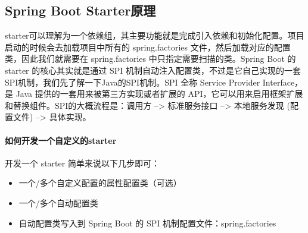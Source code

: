 \documentclass[../../../interview-questions.tex]{subfiles}
\begin{document}
\subsection{Spring Boot Starter原理}

starter可以理解为一个依赖组，其主要功能就是完成引入依赖和初始化配置。项目启动的时候会去加载项目中所有的 spring.factories 文件，然后加载对应的配置类，因此我们就需要在 spring.factories 中只指定需要扫描的类。Spring Boot 的 starter 的核心其实就是通过 SPI 机制自动注入配置类，不过是它自己实现的一套SPI机制，我们先了解一下Java的SPI机制。SPI 全称 Service Provider Interface，是 Java 提供的一套用来被第三方实现或者扩展的 API，它可以用来启用框架扩展和替换组件。SPI的大概流程是：调用方 –> 标准服务接口 –> 本地服务发现 (配置文件) –> 具体实现。

\paragraph{如何开发一个自定义的starter}

开发一个 starter 简单来说以下几步即可：

\begin{itemize}
    \item {一个/多个自定义配置的属性配置类（可选）}
    \item {一个/多个自动配置类}
    \item {自动配置类写入到 Spring Boot 的 SPI 机制配置文件：spring.factories}
\end{itemize}
\end{document}
